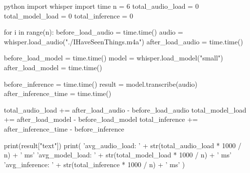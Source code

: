 

\begin{mintedbox}{python}
import whisper
import time
n = 6
total_audio_load = 0
total_model_load = 0
total_inference = 0

for i in range(n):
  before_load_audio = time.time()
  audio = whisper.load_audio("./IHaveSeenThings.m4a")
  after_load_audio = time.time()

  before_load_model = time.time()
  model = whisper.load_model("small")
  after_load_model = time.time()

  before_inference = time.time()
  result = model.transcribe(audio)
  after_inference_time = time.time()

  total_audio_load += after_load_audio - before_load_audio
  total_model_load += after_load_model - before_load_model
  total_inference += after_inference_time - before_inference

print(result["text"])
print(
  'avg_audio_load: ' + str(total_audio_load * 1000 / n) + ' ms\n'
  'avg_model_load: ' + str(total_model_load * 1000 / n) + ' ms\n'
  'avg_inference: ' + str(total_inference * 1000 / n) + ' ms\n'
)
\end{mintedbox}